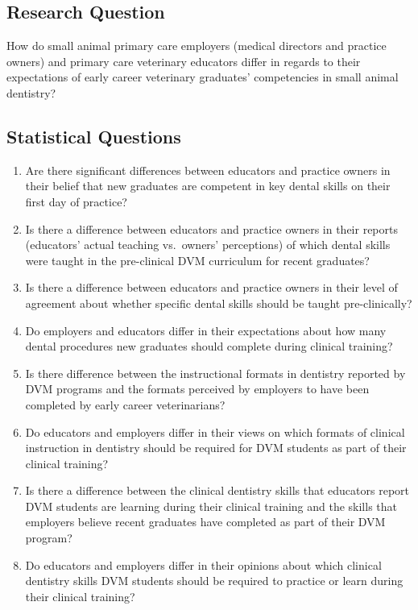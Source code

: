 \documentclass[
  11pt,
  letterpaper,
  DIV=11,
  numbers=noendperiod]{scrartcl}
\numberwithin{figure}{section}
\begin{document}
\hypertarget{research-question}{%
\subsection{Research Question}\label{research-question}}

How do small animal primary care employers (medical directors and
practice owners) and primary care veterinary educators differ in regards
to their expectations of early career veterinary graduates' competencies
in small animal dentistry?

\hypertarget{statistical-questions}{%
\subsection{Statistical Questions}\label{statistical-questions}}

\begin{enumerate}
\def\labelenumi{\arabic{enumi}.}
\item
  Are there significant differences between educators and practice
  owners in their belief that new graduates are competent in key dental
  skills on their first day of practice?
\item
  Is there a difference between educators and practice owners in their
  reports (educators' actual teaching vs.~owners' perceptions) of which
  dental skills were taught in the pre-clinical DVM curriculum for
  recent graduates?
\item
  Is there a difference between educators and practice owners in their
  level of agreement about whether specific dental skills should be
  taught pre-clinically?
\item
  Do employers and educators differ in their expectations about how many
  dental procedures new graduates should complete during clinical
  training?
\item
  Is there difference between the instructional formats in dentistry
  reported by DVM programs and the formats perceived by employers to
  have been completed by early career veterinarians?
\item
  Do educators and employers differ in their views on which formats of
  clinical instruction in dentistry should be required for DVM students
  as part of their clinical training?
\item
  Is there a difference between the clinical dentistry skills that
  educators report DVM students are learning during their clinical
  training and the skills that employers believe recent graduates have
  completed as part of their DVM program?
\item
  Do educators and employers differ in their opinions about which
  clinical dentistry skills DVM students should be required to practice
  or learn during their clinical training?
\end{enumerate}
\end{document}
